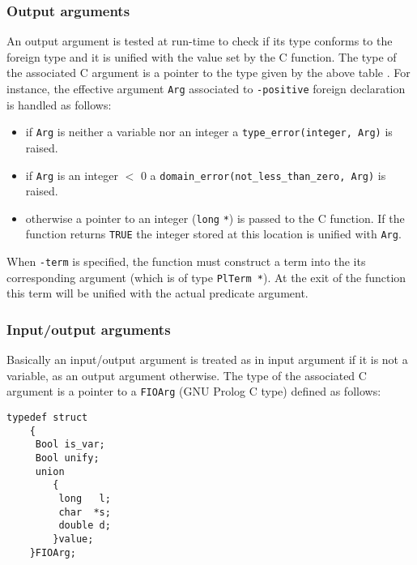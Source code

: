 \subsubsection{Output arguments}
\label{Output-arguments}
An output argument is tested at run-time to check if its type conforms to
the foreign type and it is unified with the value set by the C function. The
type of the associated C argument is a pointer to the type given by the
above table . For instance, the effective
argument \texttt{Arg} associated to \texttt{-positive} foreign declaration
is handled as follows:

\begin{itemize}

\item if \texttt{Arg} is neither a variable nor an integer a
\texttt{type\_error(integer, Arg)} is raised.

\item if \texttt{Arg} is an integer $<$ 0 a
\texttt{domain\_error(not\_less\_than\_zero, Arg)} is raised.

\item otherwise a pointer to an integer (\texttt{long} \texttt{*}) is passed
to the C function. If the function returns \texttt{TRUE} the integer stored
at this location is unified with \texttt{Arg}.

\end{itemize}

When \texttt{-term} is specified, the function must construct a term into
the its corresponding argument (which is of type \texttt{PlTerm *}). At the
exit of the function this term will be unified with the actual predicate
argument.

\subsubsection{Input/output arguments}
\label{Input/output-arguments}
Basically an input/output argument is treated as in input argument if it is
not a variable, as an output argument otherwise. The type of the associated
C argument is a pointer to a \texttt{FIOArg} (GNU Prolog C type) defined as
follows:

\begin{Indentation}
\begin{verbatim}
typedef struct
    {
     Bool is_var;
     Bool unify;
     union
        {
         long   l;
         char  *s;
         double d;
        }value;
    }FIOArg;
\end{verbatim}
\end{Indentation}


